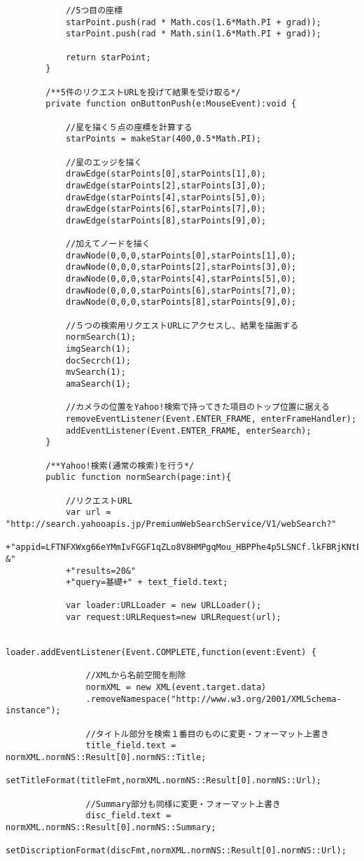 {\begin{verbatim}
			//5つ目の座標
			starPoint.push(rad * Math.cos(1.6*Math.PI + grad));
			starPoint.push(rad * Math.sin(1.6*Math.PI + grad));
			
			return starPoint;
		}
		
		/**5件のリクエストURLを投げて結果を受け取る*/
		private function onButtonPush(e:MouseEvent):void {
			
			//星を描く５点の座標を計算する
			starPoints = makeStar(400,0.5*Math.PI);
			
			//星のエッジを描く
			drawEdge(starPoints[0],starPoints[1],0);
			drawEdge(starPoints[2],starPoints[3],0);
			drawEdge(starPoints[4],starPoints[5],0);
			drawEdge(starPoints[6],starPoints[7],0);
			drawEdge(starPoints[8],starPoints[9],0);
			
			//加えてノードを描く
			drawNode(0,0,0,starPoints[0],starPoints[1],0);
			drawNode(0,0,0,starPoints[2],starPoints[3],0);
			drawNode(0,0,0,starPoints[4],starPoints[5],0);
			drawNode(0,0,0,starPoints[6],starPoints[7],0);
			drawNode(0,0,0,starPoints[8],starPoints[9],0);
			
			//５つの検索用リクエストURLにアクセスし、結果を描画する
			normSearch(1);
			imgSearch(1);
			docSecrch(1);
			mvSearch(1);
			amaSearch(1);
			
			//カメラの位置をYahoo!検索で持ってきた項目のトップ位置に据える
			removeEventListener(Event.ENTER_FRAME, enterFrameHandler);
			addEventListener(Event.ENTER_FRAME, enterSearch);
		}
		
		/**Yahoo!検索(通常の検索)を行う*/
		public function normSearch(page:int){
			
			//リクエストURL
			var url = "http://search.yahooapis.jp/PremiumWebSearchService/V1/webSearch?"
			+"appid=LFTNFXWxg66eYMmIvFGGF1qZLo8V8HMPgqMou_HBPPhe4p5LSNCf.lkFBRjKNtE-&"
			+"results=20&"
			+"query=基礎+" + text_field.text;
			
			var loader:URLLoader = new URLLoader();
			var request:URLRequest=new URLRequest(url);

			loader.addEventListener(Event.COMPLETE,function(event:Event) {
									
				//XMLから名前空間を削除
				normXML = new XML(event.target.data)
				.removeNamespace("http://www.w3.org/2001/XMLSchema-instance");
				
				//タイトル部分を検索１番目のものに変更・フォーマット上書き
				title_field.text = normXML.normNS::Result[0].normNS::Title;
				setTitleFormat(titleFmt,normXML.normNS::Result[0].normNS::Url);
				
				//Summary部分も同様に変更・フォーマット上書き
				disc_field.text = normXML.normNS::Result[0].normNS::Summary;
				setDiscriptionFormat(discFmt,normXML.normNS::Result[0].normNS::Url);
				

\end{verbatim}}
